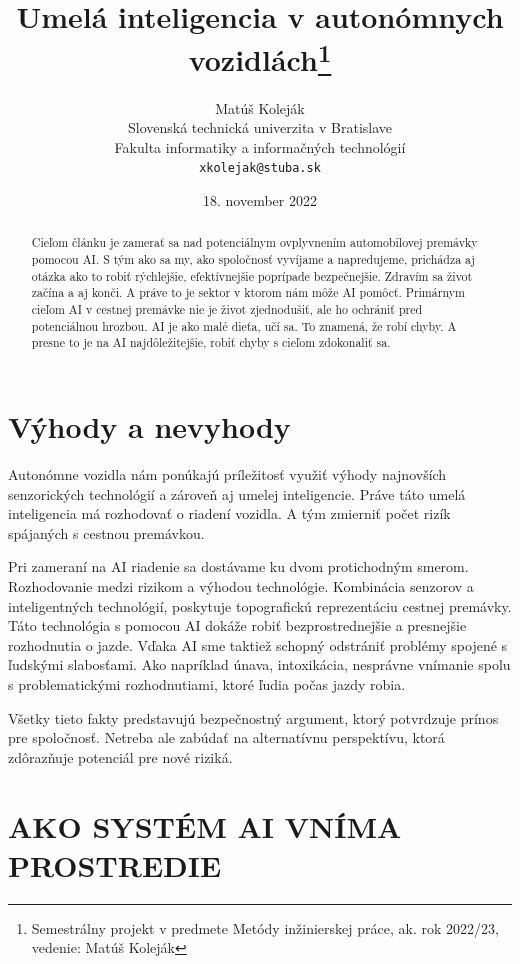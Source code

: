 \documentclass[10pt,oneside,slovak,a4paper]{article}
\title{Umelá inteligencia v autonómnych vozidlách\thanks{Semestrálny projekt v predmete Metódy inžinierskej práce, ak. rok 2022/23, vedenie: Matúš Koleják}} %
\author{Matúš Koleják\\[2pt]
	{\small Slovenská technická univerzita v Bratislave}\\
	{\small Fakulta informatiky a informačných technológií}\\
	{\small \texttt{xkolejak@stuba.sk}}
	}
\date{\small 18. november 2022} %
\begin{document}
\maketitle

\begin{abstract}
Cieľom článku je zamerať sa nad potenciálnym ovplyvnením automobilovej premávky pomocou AI. S tým ako sa my, ako spoločnosť vyvíjame a napredujeme, prichádza aj otázka ako to robiť rýchlejšie, efektívnejšie poprípade bezpečnejšie. Zdravím sa život začína a aj konči. A práve to je sektor v ktorom nám môže AI pomôcť. Primárnym cieľom AI v cestnej premávke nie je život zjednodušiť, ale ho ochrániť pred potenciálnou hrozbou. AI je ako malé dieťa, učí sa. To znamená, že robí chyby. A presne to je na AI najdôležitejšie, robiť chyby s cieľom zdokonaliť sa.
\end{abstract}

%
\newpage

\section{Výhody a nevyhody}

Autonómne vozidla nám ponúkajú príležitosť využiť výhody najnovších senzorických technológií a zároveň aj umelej inteligencie. Práve táto umelá inteligencia má rozhodovať o riadení vozidla. A tým zmierniť počet rizík spájaných s cestnou premávkou. \par Pri zameraní na AI riadenie sa dostávame ku dvom protichodným smerom. Rozhodovanie medzi rizikom a výhodou technológie. Kombinácia senzorov a inteligentných technológií, poskytuje topografickú reprezentáciu cestnej premávky. Táto technológia s pomocou AI dokáže robiť bezprostrednejšie a presnejšie rozhodnutia o jazde. Vďaka AI sme taktiež schopný odstrániť problémy spojené s ľudskými slabosťami. Ako napríklad únava, intoxikácia, nesprávne vnímanie spolu s problematickými rozhodnutiami, ktoré ľudia počas jazdy robia.\par Všetky tieto fakty predstavujú bezpečnostný argument, ktorý potvrdzuje prínos pre spoločnosť. Netreba ale zabúdať na alternatívnu perspektívu, ktorá zdôrazňuje potenciál pre nové riziká.
\cite{floridi2018ai4people,doi:10.1080/08839514.2019.1600301}



\section{AKO SYSTÉM AI VNÍMA PROSTREDIE}\label{viditelnot}
\end{document}
